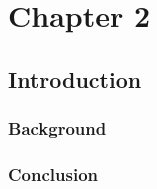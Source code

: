 \chapter{Chapter 2} \label{chapter-2}

\section{Introduction}
\blindtext

\subsection{Background} \label{chapter-2:background}
\blindtext


\subsection{Conclusion} \label{chapter-2:conclusion}
\blindtext